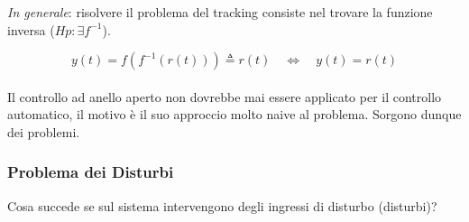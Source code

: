 \documentclass[12pt]{article}
\begin{document}
\emph{In generale}: risolvere il problema del tracking consiste nel trovare la funzione inversa ($ Hp: \exists f^{-1} $).
\begin{figure}[H]
    \begin{center}
    \end{center}
    \caption{}
    \label{fig:sistema-f}
\end{figure}
\[ y(t) = f\left( f^{-1}(r(t)) \right) \triangleq r(t) \quad\Leftrightarrow\quad y(t) = r(t) \] \\
Il controllo ad anello aperto non dovrebbe mai essere applicato per il controllo automatico, il motivo \`e il suo approccio molto naive al problema. Sorgono dunque dei problemi.

\subsubsection{Problema dei Disturbi}\label{sec:problema-dei-disturbi}
Cosa succede se sul sistema intervengono degli ingressi di disturbo (disturbi)?
\end{document}
